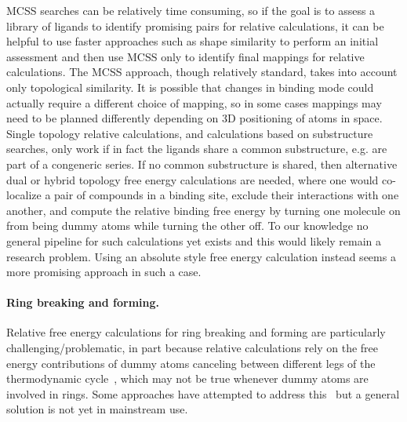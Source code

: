 \documentclass[9pt,bestpractices]{livecoms}
\begin{document}
%
MCSS searches can be relatively time consuming, so if the goal is to assess a library of ligands to identify promising pairs for relative calculations, it can be helpful to use faster approaches such as shape similarity to perform an initial assessment and then use MCSS only to identify final mappings for relative calculations.
%
The MCSS approach, though relatively standard, takes into account only topological similarity.
It is possible that changes in binding mode could actually require a different choice of mapping, so in some cases mappings may need to be planned differently depending on 3D positioning of atoms in space.
%
Single topology relative calculations, and calculations based on substructure searches, only work if in fact the ligands share a common substructure, e.g. are part of a congeneric series.
If no common substructure is shared, then alternative dual or hybrid topology free energy calculations are needed, where one would co-localize a pair of compounds in a binding site, exclude their interactions with one another, and compute the relative binding free energy by turning one molecule on from being dummy atoms while turning the other off.
To our knowledge no general pipeline for such calculations yet exists and this would likely remain a research problem. Using an absolute style free energy calculation instead seems a more promising approach in such a case. 
%
\paragraph{Ring breaking and forming.} Relative free energy calculations for ring breaking and forming are particularly challenging/problematic, in part because relative calculations rely on the free energy contributions of dummy atoms canceling between different legs of the thermodynamic cycle~\cite{}, which may not be true whenever dummy atoms are involved in rings.
Some approaches have attempted to address this~\cite{clark2019relative} but a general solution is not yet in mainstream use.
%
\end{document}

